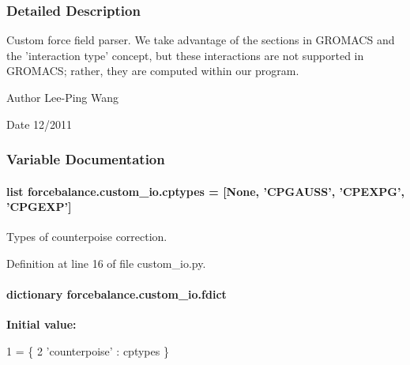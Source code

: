 \subsubsection{Detailed Description}
Custom force field parser. We take advantage of the sections in G\-R\-O\-M\-A\-C\-S and the 'interaction type' concept, but these interactions are not supported in G\-R\-O\-M\-A\-C\-S; rather, they are computed within our program.

\begin{DoxyAuthor}{Author}
Lee-\/\-Ping Wang 
\end{DoxyAuthor}
\begin{DoxyDate}{Date}
12/2011 
\end{DoxyDate}


\subsubsection{Variable Documentation}
\hypertarget{namespaceforcebalance_1_1custom__io_a74431bfa66994d256928c07d0ce7e863}{
\paragraph[{cptypes}]{\setlength{\rightskip}{0pt plus 5cm}list forcebalance.\-custom\-\_\-io.\-cptypes = \mbox{[}None, 'C\-P\-G\-A\-U\-S\-S', 'C\-P\-E\-X\-P\-G', 'C\-P\-G\-E\-X\-P'\mbox{]}}}\label{namespaceforcebalance_1_1custom__io_a74431bfa66994d256928c07d0ce7e863}


Types of counterpoise correction. 



Definition at line 16 of file custom\-\_\-io.\-py.

\hypertarget{namespaceforcebalance_1_1custom__io_afc7a3a5f5b6f4b329abb6992eef3f7f3}{
\paragraph[{fdict}]{\setlength{\rightskip}{0pt plus 5cm}dictionary forcebalance.\-custom\-\_\-io.\-fdict}}\label{namespaceforcebalance_1_1custom__io_afc7a3a5f5b6f4b329abb6992eef3f7f3}
{\bfseries Initial value\-:}
\begin{DoxyCode}
1 = \{
2     \textcolor{stringliteral}{'counterpoise'}  : cptypes    \}
\end{DoxyCode}


